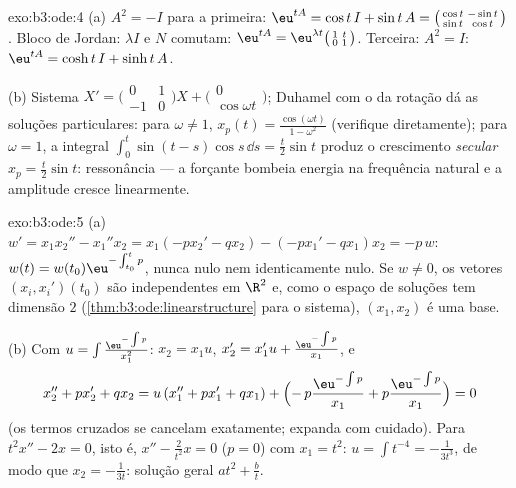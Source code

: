\begin{solution}{exo:b3:ode:4}
(a) $A^2 = -I$ para a primeira: $\eu^{tA} = \cos t\,I + \sin
t\,A = \bigl(\begin{smallmatrix}\cos t & -\sin t\\ \sin t &
\cos t\end{smallmatrix}\bigr)$. Bloco de Jordan: $\lambda I$ e
$N$ comutam: $\eu^{tA} =
\eu^{\lambda t}\bigl(\begin{smallmatrix}1 & t\\ 0 &
1\end{smallmatrix}\bigr)$. Terceira: $A^2 = I$: $\eu^{tA} =
\cosh t\,I + \sinh t\,A$.

(b) Sistema $X' = \bigl(\begin{smallmatrix}0&1\\-1&0
\end{smallmatrix}\bigr)X + \bigl(\begin{smallmatrix}0\\
\cos\omega t\end{smallmatrix}\bigr)$; Duhamel com o
 da rotação dá as soluções particulares: para
$\omega \neq 1$, $x_p(t) = \frac{\cos(\omega t)}{1 -
\omega^2}$ (verifique diretamente); para $\omega = 1$, a integral
$\int_0^t\sin(t - s)\cos s\,\dd s = \frac t2\sin t$ produz
o crescimento \emph{secular} $x_p = \frac t2\sin t$: ressonância
--- a forçante bombeia energia na frequência natural e a
amplitude cresce linearmente.
\end{solution}

\begin{solution}{exo:b3:ode:5}
(a) $w' = x_1x_2'' - x_1''x_2 = x_1(-px_2' - qx_2) - (-px_1'
- qx_1)x_2 = -p\,w$: $w(t) = w(t_0)\eu^{-\int_{t_0}^tp}$,
nunca nulo nem identicamente nulo. Se $w \neq 0$, os vetores
$(x_i, x_i')(t_0)$ são independentes em $\R^2$ e, como o
espaço de soluções tem dimensão $2$
(\cref{thm:b3:ode:linearstructure} para o sistema), $(x_1,
x_2)$ é uma base.

(b) Com $u = \int\frac{\eu^{-\int p}}{x_1^2}$: $x_2 = x_1u$,
$x_2' = x_1'u + \frac{\eu^{-\int p}}{x_1}$, e
\[
x_2'' + px_2' + qx_2
= u\,(x_1'' + px_1' + qx_1) +
\Bigl(-\,p\frac{\eu^{-\int p}}{x_1} +
p\frac{\eu^{-\int p}}{x_1}\Bigr) = 0
\]
(os termos cruzados se cancelam exatamente; expanda com cuidado). Para
$t^2x'' - 2x = 0$, isto é, $x'' - \frac2{t^2}x = 0$ ($p = 0$)
com $x_1 = t^2$: $u = \int t^{-4} = -\frac1{3t^3}$, de modo que $x_2
= -\frac1{3t}$: solução geral $at^2 + \frac bt$.
\end{solution}

